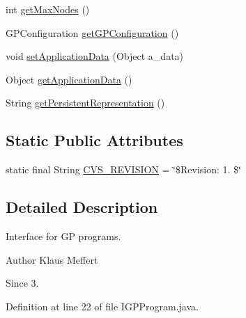 \begin{DoxyCompactItemize}
\item 
int \hyperlink{interfaceorg_1_1jgap_1_1gp_1_1_i_g_p_program_a414441248d79c3d6766ac6b65dee851a}{get\-Max\-Nodes} ()
\item 
G\-P\-Configuration \hyperlink{interfaceorg_1_1jgap_1_1gp_1_1_i_g_p_program_af159eca7bbd36510b6a50c85ec4cc64f}{get\-G\-P\-Configuration} ()
\item 
void \hyperlink{interfaceorg_1_1jgap_1_1gp_1_1_i_g_p_program_aa0e6c95c920958bd77593fcb97df1659}{set\-Application\-Data} (Object a\-\_\-data)
\item 
Object \hyperlink{interfaceorg_1_1jgap_1_1gp_1_1_i_g_p_program_a9accc43d80121dc34557c5620b7ed484}{get\-Application\-Data} ()
\item 
String \hyperlink{interfaceorg_1_1jgap_1_1gp_1_1_i_g_p_program_a3cfa46075460f3b56b914603cef73c66}{get\-Persistent\-Representation} ()
\end{DoxyCompactItemize}
\subsection*{Static Public Attributes}
\begin{DoxyCompactItemize}
\item 
static final String \hyperlink{interfaceorg_1_1jgap_1_1gp_1_1_i_g_p_program_a9b256f58b194a88fdc5bd5e47c33f83d}{C\-V\-S\-\_\-\-R\-E\-V\-I\-S\-I\-O\-N} = \char`\"{}\$Revision\-: 1. \$\char`\"{}
\end{DoxyCompactItemize}


\subsection{Detailed Description}
Interface for G\-P programs.

\begin{DoxyAuthor}{Author}
Klaus Meffert 
\end{DoxyAuthor}
\begin{DoxySince}{Since}
3. 
\end{DoxySince}


Definition at line 22 of file I\-G\-P\-Program.\-java.



